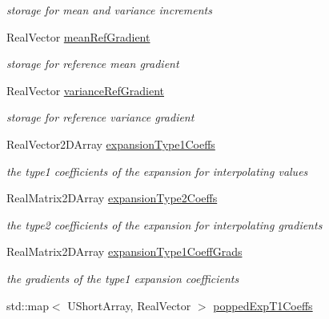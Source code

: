 \begin{DoxyCompactItemize}
\begin{DoxyCompactList}\small\item\em storage for mean and variance increments \end{DoxyCompactList}\item 
Real\+Vector \hyperlink{classPecos_1_1HierarchInterpPolyApproximation_a6d6dc2dcd8270dc465405410a27872f1}{mean\+Ref\+Gradient}\label{classPecos_1_1HierarchInterpPolyApproximation_a6d6dc2dcd8270dc465405410a27872f1}

\begin{DoxyCompactList}\small\item\em storage for reference mean gradient \end{DoxyCompactList}\item 
Real\+Vector \hyperlink{classPecos_1_1HierarchInterpPolyApproximation_a329e9ddbea4462741f4629f6aeb893d4}{variance\+Ref\+Gradient}\label{classPecos_1_1HierarchInterpPolyApproximation_a329e9ddbea4462741f4629f6aeb893d4}

\begin{DoxyCompactList}\small\item\em storage for reference variance gradient \end{DoxyCompactList}\item 
Real\+Vector2\+D\+Array \hyperlink{classPecos_1_1HierarchInterpPolyApproximation_a48579624dbb5f01dd7c51966d3ec2dd0}{expansion\+Type1\+Coeffs}\label{classPecos_1_1HierarchInterpPolyApproximation_a48579624dbb5f01dd7c51966d3ec2dd0}

\begin{DoxyCompactList}\small\item\em the type1 coefficients of the expansion for interpolating values \end{DoxyCompactList}\item 
Real\+Matrix2\+D\+Array \hyperlink{classPecos_1_1HierarchInterpPolyApproximation_a1ab17ab8f6a21083466a39ac7103a347}{expansion\+Type2\+Coeffs}\label{classPecos_1_1HierarchInterpPolyApproximation_a1ab17ab8f6a21083466a39ac7103a347}

\begin{DoxyCompactList}\small\item\em the type2 coefficients of the expansion for interpolating gradients \end{DoxyCompactList}\item 
Real\+Matrix2\+D\+Array \hyperlink{classPecos_1_1HierarchInterpPolyApproximation_ad99e5330509824547f220676f9c250fe}{expansion\+Type1\+Coeff\+Grads}
\begin{DoxyCompactList}\small\item\em the gradients of the type1 expansion coefficients \end{DoxyCompactList}\item 
std\+::map$<$ U\+Short\+Array, Real\+Vector $>$ \hyperlink{classPecos_1_1HierarchInterpPolyApproximation_a45dd45e174354fb9fe718c207a717c9e}{popped\+Exp\+T1\+Coeffs}\label{classPecos_1_1HierarchInterpPolyApproximation_a45dd45e174354fb9fe718c207a717c9e}


\end{DoxyCompactItemize}
